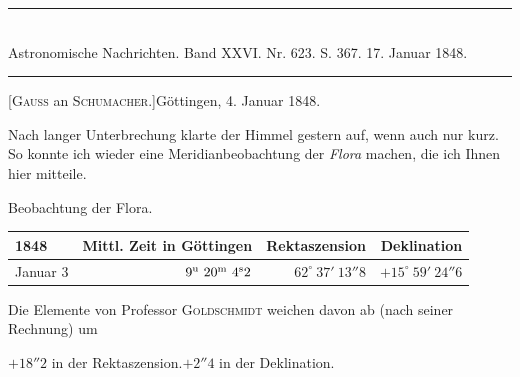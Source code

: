 \clearpage
\hypertarget{native-481-january4}{}
\begin{center}
\rule{0.55\linewidth}{0.4pt}\\[2pt]
Astronomische Nachrichten. Band XXVI. Nr. 623. S. 367. 17. Januar 1848.\\[2pt]
\rule{0.55\linewidth}{0.4pt}
\end{center}
\begin{center}[\textsc{Gauss} an \textsc{Schumacher}.]\quad Göttingen, 4. Januar 1848.\end{center}

Nach langer Unterbrechung klarte der Himmel gestern auf, wenn auch nur kurz. So konnte ich wieder eine Meridianbeobachtung der \emph{Flora} machen, die ich Ihnen hier mitteile.

\begin{center}
Beobachtung der Flora.\\[3pt]
\setlength{\tabcolsep}{4pt}
\begin{tabular}{l|r|r|r}
1848 & Mittl. Zeit in Göttingen & Rektaszension & Deklination \\\hline
Januar 3 & $9^{\rm u}\ 20^{\rm m}\ 4^{\rm s}2$ & $62^\circ\ 37'\ 13''8$ & $+15^\circ\ 59'\ 24''6$ \\
\end{tabular}
\end{center}

Die Elemente von Professor \textsc{Goldschmidt} weichen davon ab (nach seiner Rechnung) um

\begin{center}
$+18''2$ in der Rektaszension.\qquad $+2''4$ in der Deklination.
\end{center}

